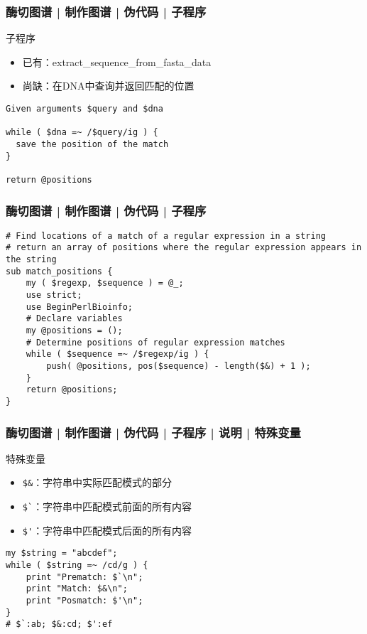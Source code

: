 \begin{frame}[fragile]
  \frametitle{酶切图谱 | 制作图谱 | 伪代码 | 子程序}
  \begin{block}{子程序}
    \begin{itemize}
      \item 已有：extract\_sequence\_from\_fasta\_data
      \item 尚缺：在DNA中查询并返回匹配的位置
    \end{itemize}
  \end{block}
  \pause
\begin{lstlisting}
Given arguments $query and $dna

while ( $dna =~ /$query/ig ) {
  save the position of the match
}

return @positions
\end{lstlisting}
\end{frame}

\begin{frame}[fragile]
  \frametitle{酶切图谱 | 制作图谱 | 伪代码 | \alert{子程序}}
\begin{lstlisting}[basicstyle=\small\tt,numberstyle=\footnotesize]
# Find locations of a match of a regular expression in a string
# return an array of positions where the regular expression appears in the string
sub match_positions {
    my ( $regexp, $sequence ) = @_;
    use strict;
    use BeginPerlBioinfo;
    # Declare variables
    my @positions = ();
    # Determine positions of regular expression matches
    while ( $sequence =~ /$regexp/ig ) {
        push( @positions, pos($sequence) - length($&) + 1 );
    }
    return @positions;
}
\end{lstlisting}
\end{frame}

\begin{frame}[fragile]
  \frametitle{酶切图谱 | 制作图谱 | 伪代码 | 子程序 | 说明 | \alert{特殊变量}}
  \begin{block}{特殊变量}
    \begin{itemize}
      \item \verb|$&|：字符串中实际匹配模式的部分
      \item \verb|$`|：字符串中匹配模式前面的所有内容
      \item \verb|$'|：字符串中匹配模式后面的所有内容
    \end{itemize}
  \end{block}
  \pause
\begin{lstlisting}
my $string = "abcdef";
while ( $string =~ /cd/g ) {
    print "Prematch: $`\n";
    print "Match: $&\n";
    print "Posmatch: $'\n";
}
# $`:ab; $&:cd; $':ef
\end{lstlisting}
\end{frame}

